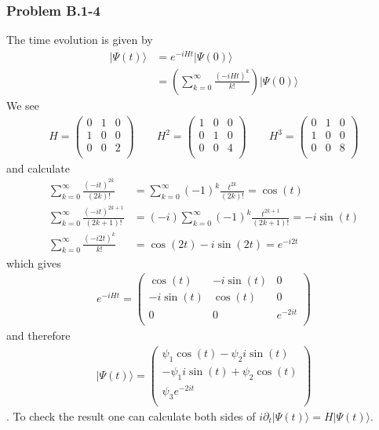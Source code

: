 \documentclass[10pt,a4paper]{article}
\theoremstyle{definition}
\begin{document}
\subsubsection{Problem B.1-4}
The time evolution is given by
\begin{align}
    |\Psi(t)\rangle&=e^{-iHt}|\Psi(0)\rangle\\
    &=\left(\sum_{k=0}^\infty\frac{(-iHt)^k}{k!}\right)|\Psi(0)\rangle
\end{align}
We see
\begin{align}
H=\left(
\begin{array}{ccc}
 0 & 1 & 0 \\
 1 & 0 & 0 \\
 0 & 0 & 2 \\
\end{array}
\right)\qquad
H^2=\left(
\begin{array}{ccc}
 1 & 0 & 0 \\
 0 & 1 & 0 \\
 0 & 0 & 4 \\
\end{array}
\right)
\qquad
H^3=\left(
\begin{array}{ccc}
 0 & 1 & 0 \\
 1 & 0 & 0 \\
 0 & 0 & 8 \\
\end{array}
\right)
\end{align}
and calculate
\begin{align}
    \sum_{k=0}^\infty\frac{(-it)^{2k}}{(2k)!}&=\sum_{k=0}^\infty(-1)^k \frac{t^{2k}}{(2k)!}=\cos(t)\\
    \sum_{k=0}^\infty\frac{(-it)^{2k+1}}{(2k+1)!}&=(-i)\sum_{k=0}^\infty(-1)^{k}\frac{t^{2k+1}}{(2k+1)!}=-i\sin(t)\\
    \sum_{k=0}^\infty\frac{(-i2t)^k}{k!}&=\cos(2t)-i\sin(2t)=e^{-i2t}
\end{align}
which gives
\begin{align}
    e^{-iHt}=\left(
\begin{array}{ccc}
 \cos (t) & -i \sin (t) & 0 \\
 -i \sin (t) & \cos (t) & 0 \\
 0 & 0 & e^{-2 i t} \\
\end{array}
\right)
\end{align}
and therefore
\begin{align}
|\Psi(t)\rangle=\left(
\begin{array}{ccc}
 \psi_1\cos (t)  -\psi_2i \sin (t) \\
 -\psi_1i \sin (t) + \psi_2\cos (t) \\
 \psi_3e^{-2 i t} \\
\end{array}
\right)
\end{align}.
To check the result one can calculate both sides of $i\partial_t|\Psi(t)\rangle=H|\Psi(t)\rangle$.
\end{document}
